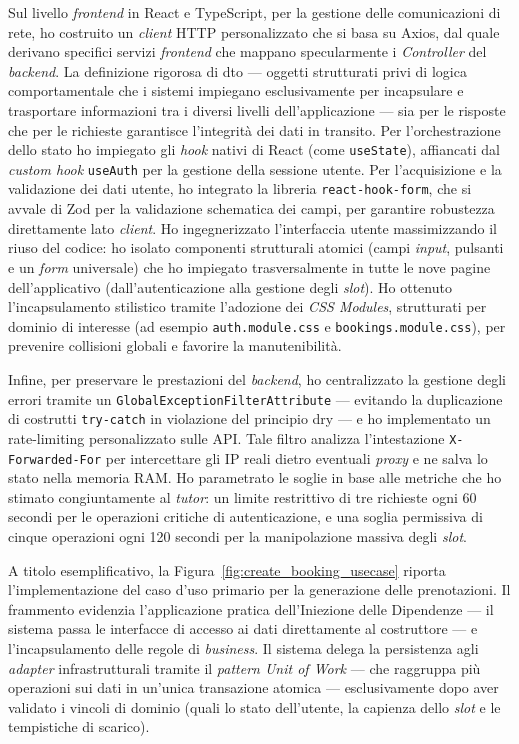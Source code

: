 Sul livello \textit{frontend} in React e TypeScript, per la gestione delle comunicazioni di rete, ho costruito un \textit{client} HTTP personalizzato che si basa su Axios, dal quale derivano specifici servizi \textit{frontend} che mappano specularmente i \textit{Controller} del \textit{backend}. La definizione rigorosa di \gls{dto} --- oggetti strutturati privi di logica comportamentale che i sistemi impiegano esclusivamente per incapsulare e trasportare informazioni tra i diversi livelli dell'applicazione --- sia per le risposte che per le richieste garantisce l'integrità dei dati in transito. Per l'orchestrazione dello stato ho impiegato gli \textit{hook} nativi di React (come \texttt{useState}), affiancati dal \textit{custom hook} \texttt{useAuth} per la gestione della sessione utente. Per l'acquisizione e la validazione dei dati utente, ho integrato la libreria \texttt{react-hook-form}, che si avvale di Zod per la validazione schematica dei campi, per garantire robustezza direttamente lato \textit{client}. Ho ingegnerizzato l'interfaccia utente massimizzando il riuso del codice: ho isolato componenti strutturali atomici (campi \textit{input}, pulsanti e un \textit{form} universale) che ho impiegato trasversalmente in tutte le nove pagine dell'applicativo (dall'autenticazione alla gestione degli \textit{slot}). Ho ottenuto l'incapsulamento stilistico tramite l'adozione dei \textit{CSS Modules}, strutturati per dominio di interesse (ad esempio \texttt{auth.module.css} e \texttt{bookings.module.css}),  per prevenire collisioni globali e favorire la manutenibilità.

Infine, per preservare le prestazioni del \textit{backend}, ho centralizzato la gestione degli errori tramite un \texttt{GlobalExceptionFilterAttribute} --- evitando la duplicazione di costrutti \texttt{try-catch} in violazione del principio \gls{dry} --- e ho implementato un \gls{rate-limiting} personalizzato sulle API. Tale filtro analizza l'intestazione \texttt{X-Forwarded-For} per intercettare gli IP reali dietro eventuali \textit{proxy} e ne salva lo stato nella memoria RAM. Ho parametrato le soglie in base alle metriche che ho stimato congiuntamente al \textit{tutor}: un limite restrittivo di tre richieste ogni 60 secondi per le operazioni critiche di autenticazione, e una soglia permissiva di cinque operazioni ogni 120 secondi per la manipolazione massiva degli \textit{slot}.

A titolo esemplificativo, la Figura~\ref{fig:create_booking_usecase} riporta l'implementazione del caso d'uso primario per la generazione delle prenotazioni. Il frammento evidenzia l'applicazione pratica dell'Iniezione delle Dipendenze --- il sistema passa le interfacce di accesso ai dati direttamente al costruttore --- e l'incapsulamento delle regole di \textit{business}. Il sistema delega la persistenza agli \textit{adapter} infrastrutturali tramite il \textit{pattern Unit of Work} --- che raggruppa più operazioni sui dati in un'unica transazione atomica --- esclusivamente dopo aver validato i vincoli di dominio (quali lo stato dell'utente, la capienza dello \textit{slot} e le tempistiche di scarico).

